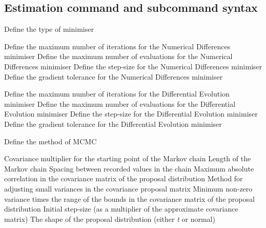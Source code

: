 \subsection{Estimation command and subcommand syntax}
\par
\par {}\par
{} {Define the type of minimiser}
\par\textbf{}\par
{} {Define the maximum number of iterations for the Numerical Differences minimiser}
 {Define the maximum number of evaluations for the Numerical Differences minimiser}
 {Define the step-size for the Numerical Differences minimiser}
 {Define the gradient tolerance for the Numerical Differences minimiser}
\par\textbf{}\par
{} {Define the maximum number of iterations for the Differential Evolution minimiser}
 {Define the maximum number of evaluations for the Differential Evolution minimiser}
 {Define the step-size for the Differential Evolution minimiser}
 {Define the gradient tolerance for the Differential Evolution minimiser}
\par {}\par
{} {Define the method of MCMC}
\par\textbf{}\par
{} {Covariance multiplier for the starting point of the Markov chain}
 {Length of the Markov chain}
 {Spacing between recorded values in the chain}
 {Maximum absolute correlation in the covariance matrix of the proposal distribution}
 {Method for adjusting small variances in the covariance proposal matrix}
 {Minimum non-zero variance times the range of the bounds in the covariance matrix of the proposal distribution}
 {Initial step-size (as a multiplier of the approximate covariance matrix)}
 {The shape of the proposal distribution (either \textit{t} or normal)}
